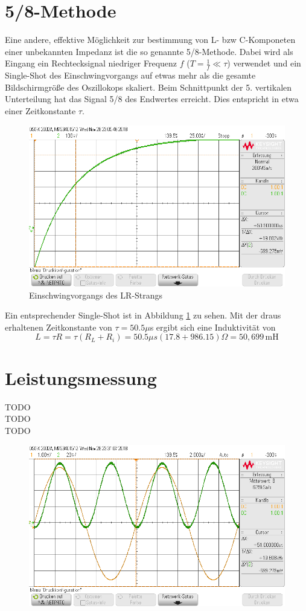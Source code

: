 \section{5/8-Methode}
Eine andere, effektive Möglichkeit zur bestimmung von L- bzw C-Komponeten einer unbekannten Impedanz ist die so genannte 5/8-Methode. Dabei wird als Eingang ein Rechtecksignal niedriger Frequenz $f$ ($T = \frac{1}{f} \ll \tau$) verwendet und ein Single-Shot des Einschwingvorgangs auf etwas mehr als die gesamte Bildschirmgröße des Oszillokops skaliert. Beim Schnittpunkt der 5. vertikalen Unterteilung hat das Signal 5/8 des Endwertes erreicht. Dies entspricht in etwa einer Zeitkonstante $\tau$. \\
\begin{figure}[H]
	\includegraphics[width=\textwidth]{./img/ch2/58_methode.png}
	\centering
	\caption{Einschwingvorgangs des LR-Strangs}
	\label{fig:rl_einschwing}
\end{figure} \noindent
Ein entsprechender Single-Shot ist in Abbildung \ref{fig:rl_einschwing} zu sehen. Mit der draus erhaltenen Zeitkonstante von $\tau = 50.5 \mu$s ergibt sich eine Induktivität von
\begin{equation}
	L = \tau R = \tau (R_L + R_i) = 50.5 \mu s (17.8 + 986.15) \Omega = 50,699\,\text{mH}
\end{equation}
\section{Leistungsmessung}
TODO \\
TODO \\
TODO \\
\begin{figure}[H]
	\includegraphics[width=\textwidth]{./img/ch2/leistung.png}
	\centering
	\label{XXXXX}
\end{figure}